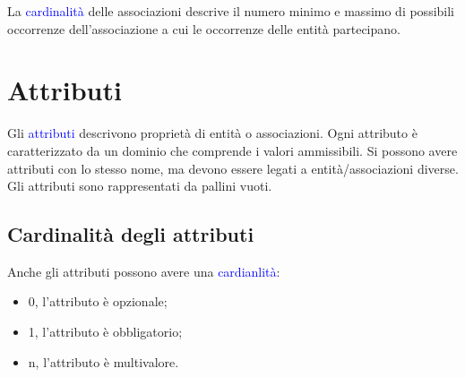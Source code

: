 La \textcolor{blue}{cardinalità} delle associazioni descrive il numero minimo e massimo di possibili occorrenze dell'associazione a cui le occorrenze delle entità partecipano.

\begin{center}
\end{center}

\section{Attributi}

Gli \textcolor{blue}{attributi} descrivono proprietà di entità o associazioni. Ogni attributo è caratterizzato da un dominio che comprende i valori ammissibili. Si possono avere attributi con lo stesso nome, ma devono essere legati a entità/associazioni diverse. Gli attributi sono rappresentati da pallini vuoti.

\begin{center}
\end{center}

\subsection{Cardinalità degli attributi}

Anche gli attributi possono avere una \textcolor{blue}{cardianlità}:

\begin{itemize}
    \item 0, l'attributo è opzionale;
    \item 1, l'attributo è obbligatorio;
    \item n, l'attributo è multivalore.
\end{itemize}

